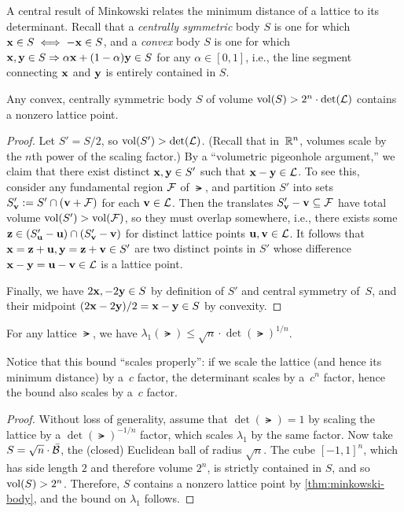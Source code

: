 \documentclass[11pt]{article}
\begin{document}
A central result of Minkowski relates the minimum distance of a
lattice to its determinant.  Recall that a \emph{centrally symmetric}
body $S$ is one for which $\mathbf{x} \in S \iff -\mathbf{x} \in S$, and a
\emph{convex} body $S$ is one for which $\mathbf{x}, \mathbf{y} \in S
\Rightarrow \alpha \mathbf{x} + (1-\alpha) \mathbf{y} \in S$ for any $\alpha \in
[0,1]$, i.e., the line segment connecting $\mathbf{x}$ and $\mathbf{y}$ is
entirely contained in $S$.

\begin{theorem}[Minkowski]
  \label{thm:minkowski-body}
  Any convex, centrally symmetric body $S$ of volume $\operatorname{vol}(S) >
  2^n \cdot \det(\mathcal{L})$ contains a nonzero lattice point.
\end{theorem}

\begin{proof}
  Let $S'=S/2$, so $\operatorname{vol}(S') > \det(\mathcal{L})$. (Recall that in~$\mathbb{R}^{n}$,
  volumes scale by the $n$th power of the scaling factor.) By a
  ``volumetric pigeonhole argument,'' we claim that there exist
  distinct $\mathbf{x}, \mathbf{y} \in S'$ such that $\mathbf{x}-\mathbf{y} \in \mathcal{L}$. To
  see this, consider any fundamental region $\mathcal{F}$ of $\lat$, and
  partition $S'$ into sets $S'_{\mathbf{v}} := S' \cap (\mathbf{v} + \mathcal{F})$ for
  each $\mathbf{v} \in \mathcal{L}$. Then the translates
  $S'_{\mathbf{v}} - \mathbf{v} \subseteq \mathcal{F}$ have total volume
  $\operatorname{vol}(S') > \operatorname{vol}(\mathcal{F})$, so they must overlap somewhere, i.e.,
  there exists some
  $\mathbf{z} \in (S'_{\mathbf{u}} - \mathbf{u}) \cap (S'_{\mathbf{v}} - \mathbf{v})$ for
  distinct lattice points $\mathbf{u},\mathbf{v} \in \mathcal{L}$. It follows that
  $\mathbf{x} = \mathbf{z} + \mathbf{u}, \mathbf{y} = \mathbf{z} + \mathbf{v} \in S'$ are two
  distinct points in $S'$ whose difference
  $\mathbf{x}-\mathbf{y} = \mathbf{u}-\mathbf{v} \in \mathcal{L}$ is a lattice point.

  Finally, we have $2\mathbf{x}, -2\mathbf{y}\in S$ by definition of $S'$ and
  central symmetry of~$S$, and their midpoint $(2\mathbf{x}-2\mathbf{y})/2 =
  \mathbf{x}-\mathbf{y}\in S$ by convexity.
\end{proof}

\begin{corollary}
  \label{cor:minkowski-first}
  For any lattice $\lat$, we have $\lambda_1(\lat) \leq \sqrt{n} \cdot
  \det(\lat)^{1/n}$.
\end{corollary}

Notice that this bound ``scales properly'': if we scale the lattice
(and hence its minimum distance) by a~$c$ factor, the determinant
scales by a~$c^{n}$ factor, hence the bound also scales by a~$c$
factor.

\begin{proof}
  Without loss of generality, assume that $\det(\lat) = 1$ by scaling
  the lattice by a $\det(\lat)^{-1/n}$ factor, which scales
  $\lambda_{1}$ by the same factor.  Now take $S = \sqrt{n} \cdot
  \bar{\mathcal{B}}$, the (closed) Euclidean ball of radius $\sqrt{n}$.
  The cube $[-1,1]^{n}$, which has side length $2$ and therefore
  volume $2^{n}$, is strictly contained in $S$, and so $\operatorname{vol}(S) >
  2^n$.  Therefore, $S$ contains a nonzero lattice point by
  \cref{thm:minkowski-body}, and the bound on $\lambda_{1}$
  follows.
\end{proof}
\end{document}
